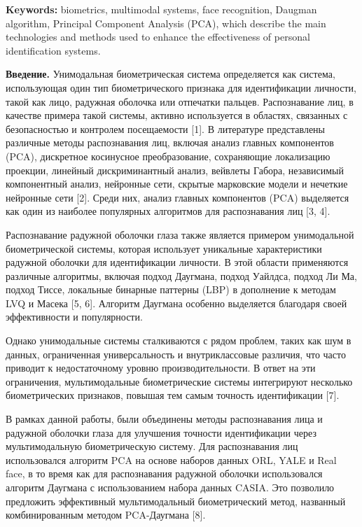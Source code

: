 {\bfseries Keywords:} biometrics, multimodal systems, face recognition,
Daugman algorithm, Principal Component Analysis (PCA), which describe
the main technologies and methods used to enhance the effectiveness of
personal identification systems.

{\bfseries Введение.} Унимодальная биометрическая система определяется как
система, использующая один тип биометрического признака для
идентификации личности, такой как лицо, радужная оболочка или отпечатки
пальцев. Распознавание лиц, в качестве примера такой системы, активно
используется в областях, связанных с безопасностью и контролем
посещаемости {[}1{]}. В литературе представлены различные методы
распознавания лиц, включая анализ главных компонентов (PCA), дискретное
косинусное преобразование, сохраняющие локализацию проекции, линейный
дискриминантный анализ, вейвлеты Габора, независимый компонентный
анализ, нейронные сети, скрытые марковские модели и нечеткие нейронные
сети {[}2{]}. Среди них, анализ главных компонентов (PCA) выделяется как
один из наиболее популярных алгоритмов для распознавания лиц {[}3, 4{]}.

Распознавание радужной оболочки глаза также является примером
унимодальной биометрической системы, которая использует уникальные
характеристики радужной оболочки для идентификации личности. В этой
области применяются различные алгоритмы, включая подход Даугмана, подход
Уайлдса, подход Ли Ма, подход Тиссе, локальные бинарные паттерны (LBP) в
дополнение к методам LVQ и Масека {[}5, 6{]}. Алгоритм Даугмана особенно
выделяется благодаря своей эффективности и популярности.

Однако унимодальные системы сталкиваются с рядом проблем, таких как шум
в данных, ограниченная универсальность и внутриклассовые различия, что
часто приводит к недостаточному уровню производительности. В ответ на
эти ограничения, мультимодальные биометрические системы интегрируют
несколько биометрических признаков, повышая тем самым точность
идентификации {[}7{]}.

В рамках данной работы, были объединены методы распознавания лица и
радужной оболочки глаза для улучшения точности идентификации через
мультимодальную биометрическую систему. Для распознавания лиц
использовался алгоритм PCA на основе наборов данных ORL, YALE и Real
face, в то время как для распознавания радужной оболочки использовался
алгоритм Даугмана с использованием набора данных CASIA. Это позволило
предложить эффективный мультимодальный биометрический метод, названный
комбинированным методом PCA-Даугмана {[}8{]}.

